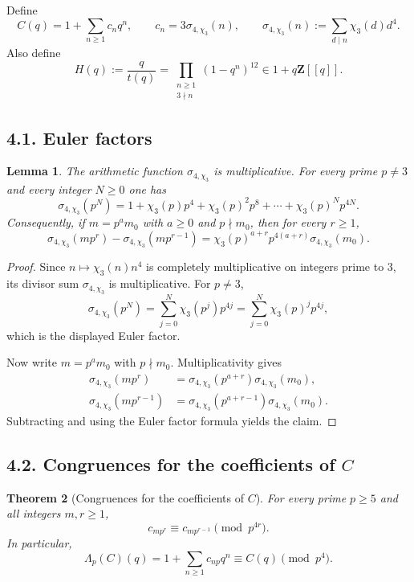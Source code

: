 \documentclass[11pt]{amsart}
\newtheorem{theorem}{Theorem}[section]
\newtheorem{lemma}[theorem]{Lemma}
\theoremstyle{remark}
\newcommand{\Z}{\mathbf{Z}}
\begin{document}
Define
\[
C(q)=1+\sum_{n\ge1} c_n q^n,
\qquad
c_n=3\sigma_{4,\chi_3}(n),
\qquad
\sigma_{4,\chi_3}(n):=\sum_{d\mid n}\chi_3(d)d^4.
\]
Also define
\[
H(q):=\frac{q}{t(q)}=\prod_{\substack{n\ge1\\3\nmid n}}(1-q^n)^{12}\in 1+q\Z[[q]].
\]

\subsection*{4.1. Euler factors}

\begin{lemma}\label{lem:euler-factor}
The arithmetic function $\sigma_{4,\chi_3}$ is multiplicative. For every prime $p\neq 3$ and every integer $N\ge0$ one has
\[
\sigma_{4,\chi_3}(p^N)=1+\chi_3(p)p^4+\chi_3(p)^2p^8+\cdots+\chi_3(p)^N p^{4N}.
\]
Consequently, if $m=p^a m_0$ with $a\ge0$ and $p\nmid m_0$, then for every $r\ge1$,
\[
\sigma_{4,\chi_3}(mp^r)-\sigma_{4,\chi_3}(mp^{r-1})
=
\chi_3(p)^{a+r}p^{4(a+r)}\sigma_{4,\chi_3}(m_0).
\]
\end{lemma}

\begin{proof}
Since $n\mapsto \chi_3(n)n^4$ is completely multiplicative on integers prime to $3$, its divisor sum $\sigma_{4,\chi_3}$ is multiplicative. For $p\neq3$,
\[
\sigma_{4,\chi_3}(p^N)=\sum_{j=0}^N \chi_3(p^j)p^{4j}=
\sum_{j=0}^N \chi_3(p)^j p^{4j},
\]
which is the displayed Euler factor.

Now write $m=p^am_0$ with $p\nmid m_0$. Multiplicativity gives
\begin{align*}
\sigma_{4,\chi_3}(mp^r)
&=\sigma_{4,\chi_3}(p^{a+r})\sigma_{4,\chi_3}(m_0),\\
\sigma_{4,\chi_3}(mp^{r-1})
&=\sigma_{4,\chi_3}(p^{a+r-1})\sigma_{4,\chi_3}(m_0).
\end{align*}
Subtracting and using the Euler factor formula yields the claim.
\end{proof}

\subsection*{4.2. Congruences for the coefficients of $C$}

\begin{theorem}[Congruences for the coefficients of $C$]\label{thm:tower}
For every prime $p\ge5$ and all integers $m,r\ge1$,
\[
c_{mp^r}\equiv c_{mp^{r-1}}\pmod{p^{4r}}.
\]
In particular,
\[
\Lambda_p(C)(q)=1+\sum_{n\ge1}c_{np}q^n\equiv C(q)\pmod{p^4}.
\]
\end{theorem}
\end{document}
